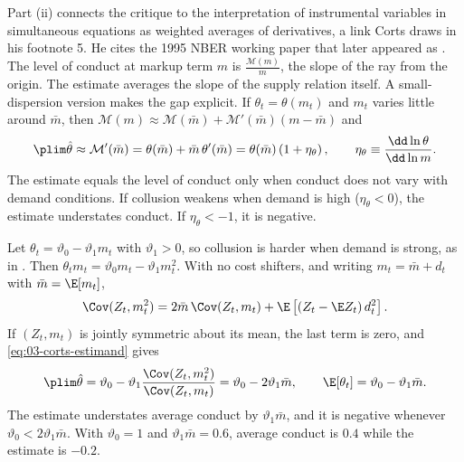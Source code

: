 Part (ii) connects the critique to the interpretation of instrumental variables in simultaneous equations as weighted
averages of derivatives, a link Corts draws in his footnote 5. He cites the 1995 NBER working paper that later appeared as
\citet{AngristGraddyImbens2000}. The level of conduct at
markup term $m$ is $\frac{\mathcal{M}(m)}{m}$, the slope of the ray from the origin. The estimate averages the slope of the
supply relation itself. A small-dispersion version makes the gap explicit. If $\theta_t = \theta(m_t)$ and $m_t$ varies
little around $\bar m$, then $\mathcal{M}(m) \approx \mathcal{M}(\bar m) + \mathcal{M}'(\bar m)(m - \bar m)$ and
\begin{equation}\label{eq:03-corts-local}
\plim \hat\theta \approx \mathcal{M}'(\bar m) = \theta(\bar m) + \bar m\, \theta'(\bar m)
= \theta(\bar m)\left(1 + \eta_\theta\right), \qquad \eta_\theta \equiv \frac{\dd\ln\theta}{\dd\ln m} .
\end{equation}
The estimate equals the level of conduct only when conduct does not vary with demand conditions. If collusion weakens when
demand is high ($\eta_\theta < 0$), the estimate understates conduct. If $\eta_\theta < -1$, it is negative.

\begin{example}\label{ex:03-corts-linear}
Let $\theta_t = \vartheta_0 - \vartheta_1 m_t$ with $\vartheta_1 > 0$, so collusion is harder when demand is strong, as in
\citet{RotembergSaloner1986}. Then $\theta_t m_t = \vartheta_0 m_t - \vartheta_1 m_t^2$. With no cost shifters, and
writing $m_t = \bar m + d_t$ with $\bar m = \E[m_t]$,
\begin{equation*}
\Cov(Z_t, m_t^2) = 2\bar m\, \Cov(Z_t, m_t) + \E\left[(Z_t - \E Z_t)\, d_t^2\right] .
\end{equation*}
If $(Z_t, m_t)$ is jointly symmetric about its mean, the last term is zero, and \eqref{eq:03-corts-estimand} gives
\begin{equation*}
\plim\hat\theta = \vartheta_0 - \vartheta_1\frac{\Cov(Z_t, m_t^2)}{\Cov(Z_t, m_t)} = \vartheta_0 - 2\vartheta_1\bar m ,
\qquad \E[\theta_t] = \vartheta_0 - \vartheta_1\bar m .
\end{equation*}
The estimate understates average conduct by $\vartheta_1\bar m$, and it is negative whenever $\vartheta_0 < 2\vartheta_1\bar
m$. With $\vartheta_0 = 1$ and $\vartheta_1\bar m = 0.6$, average conduct is $0.4$ while the estimate is $-0.2$.
\end{example}

